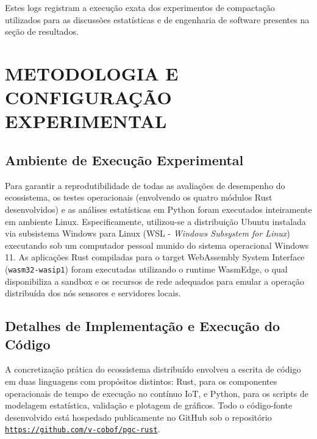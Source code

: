 \documentclass[
	12pt,
	openright,
	oneside,
	a4paper,
	english,
	brazil
	]{abntex2}
\begin{document}
Estes logs registram a execução exata dos experimentos de compactação utilizados para as discussões estatísticas e de engenharia de software presentes na seção de resultados.

\chapter{METODOLOGIA E CONFIGURAÇÃO EXPERIMENTAL}
\label{cap:metodologia}

\section{Ambiente de Execução Experimental}

Para garantir a reprodutibilidade de todas as avaliações de desempenho do ecossistema, os testes operacionais (envolvendo os quatro módulos Rust desenvolvidos) e as análises estatísticas em Python foram executados inteiramente em ambiente Linux. Especificamente, utilizou-se a distribuição Ubuntu instalada via subsistema Windows para Linux (WSL - \textit{Windows Subsystem for Linux}) executando sob um computador pessoal munido do sistema operacional Windows 11. As aplicações Rust compiladas para o target WebAssembly System Interface (\texttt{wasm32-wasip1}) foram executadas utilizando o runtime WasmEdge, o qual disponibiliza a sandbox e os recursos de rede adequados para emular a operação distribuída dos nós sensores e servidores locais.

\section{Detalhes de Implementação e Execução do Código}

A concretização prática do ecossistema distribuído envolveu a escrita de código em duas linguagens com propósitos distintos: Rust, para os componentes operacionais de tempo de execução no contínuo IoT, e Python, para os scripts de modelagem estatística, validação e plotagem de gráficos. Todo o código-fonte desenvolvido está hospedado publicamente no GitHub sob o repositório \href{https://github.com/v-cobof/pgc-rust}{\texttt{https://github.com/v-cobof/pgc-rust}}.
\end{document}
